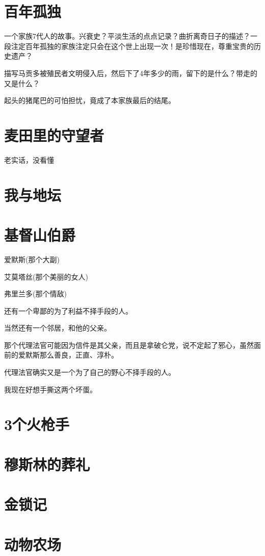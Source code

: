 \documentclass[UTF8,a4paper,12pt]{ctexbook}
\begin{document}
	\section{百年孤独}
		一个家族7代人的故事。兴衰史？平淡生活的点点记录？曲折离奇日子的描述？一段注定百年孤独的家族注定只会在这个世上出现一次！是珍惜现在，尊重宝贵的历史遗产？
		
		描写马贡多被殖民者文明侵入后，然后下了4年多少的雨，留下的是什么？带走的又是什么？
		
		起头的猪尾巴的可怕担忧，竟成了本家族最后的结尾。
		
	\section{麦田里的守望者}
		老实话，没看懂
		
	\section{我与地坛}
	
	\section{基督山伯爵}
		爱默斯(那个大副)
		
		艾莫塔丝(那个美丽的女人)
		
		弗里兰多(那个情敌)
		
		还有一个卑鄙的为了利益不择手段的人。
		
		当然还有一个邻居，和他的父亲。
		
		那个代理法官可能因为信件是其父亲，而且是拿破仑党，说不定起了邪心，虽然面前的爱默斯那么善良，正直、淳朴。
		
		代理法官确实又是一个为了自己的野心不择手段的人。
		
		我现在好想手撕这两个坏蛋。
		
	\section{3个火枪手}	
	
	\section{穆斯林的葬礼}
	
	\section{金锁记}
	
	\section{动物农场}
	
\end{document}
